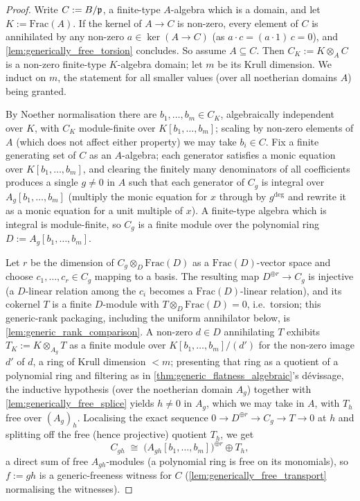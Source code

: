 \begin{proof}
\leanok
  Write \(C := B/\mathfrak{p}\), a finite-type \(A\)-algebra which is a domain, and let
  \(K := \mathrm{Frac}(A)\).  If the kernel of \(A \to C\) is non-zero, every
  element of \(C\) is annihilated by any non-zero \(a \in \ker(A \to C)\)
  (as \(a \cdot c = (a \cdot 1)\, c = 0\)), and
  \cref{lem:generically_free_torsion} concludes.  So assume \(A \subseteq C\).
  Then \(C_K := K \otimes_A C\) is a non-zero finite-type \(K\)-algebra domain;
  let \(m\) be its Krull dimension.  We induct on \(m\), the statement for all
  smaller values (over all noetherian domains \(A\)) being granted.

  By Noether normalisation there are \(b_1, \dots, b_m \in C_K\), algebraically
  independent over \(K\), with \(C_K\) module-finite over
  \(K[b_1, \dots, b_m]\); scaling by non-zero elements of \(A\) (which does not
  affect either property) we may take \(b_i \in C\).  Fix a finite generating
  set of \(C\) as an \(A\)-algebra; each generator satisfies a monic equation
  over \(K[b_1, \dots, b_m]\), and clearing the finitely many denominators of
  all coefficients produces a single \(g \ne 0\) in \(A\) such that each
  generator of \(C_g\) is integral over \(A_g[b_1, \dots, b_m]\) (multiply the
  monic equation for \(x\) through by \(g^{\deg}\) and rewrite it as a monic
  equation for a unit multiple of \(x\)).  A finite-type algebra which is
  integral is module-finite, so \(C_g\) is a finite module over the polynomial
  ring \(D := A_g[b_1, \dots, b_m]\).

  Let \(r\) be the dimension of \(C_g \otimes_D \mathrm{Frac}(D)\) as a
  \(\mathrm{Frac}(D)\)-vector space and choose \(c_1, \dots, c_r \in C_g\)
  mapping to a basis.  The resulting map \(D^{\oplus r} \to C_g\) is injective
  (a \(D\)-linear relation among the \(c_i\) becomes a
  \(\mathrm{Frac}(D)\)-linear relation), and its cokernel \(T\) is a finite
  \(D\)-module with \(T \otimes_D \mathrm{Frac}(D) = 0\), i.e.\ torsion;
  this generic-rank packaging, including the uniform annihilator below, is
  \cref{lem:generic_rank_comparison}.  A
  non-zero \(d \in D\) annihilating \(T\) exhibits
  \(T_K := K \otimes_{A_g} T\) as a finite module over
  \(K[b_1, \dots, b_m]/(d')\) for the non-zero image \(d'\) of \(d\), a ring of
  Krull dimension \(< m\); presenting that ring as a quotient of a polynomial
  ring and filtering as in \cref{thm:generic_flatness_algebraic}'s dévissage,
  the inductive hypothesis (over the noetherian domain \(A_g\)) together with
  \cref{lem:generically_free_splice} yields \(h \ne 0\) in \(A_g\), which we
  may take in \(A\), with \(T_h\) free over \((A_g)_h\).  Localising the exact
  sequence \(0 \to D^{\oplus r} \to C_g \to T \to 0\) at \(h\) and splitting
  off the free (hence projective) quotient \(T_h\), we get
  \[
    C_{gh} \;\cong\; \bigl(A_{gh}[b_1, \dots, b_m]\bigr)^{\oplus r} \oplus T_h ,
  \]
  a direct sum of free \(A_{gh}\)-modules (a polynomial ring is free on its
  monomials), so \(f := gh\) is a generic-freeness witness for \(C\)
  (\cref{lem:generically_free_transport} normalising the witnesses).
\end{proof}

